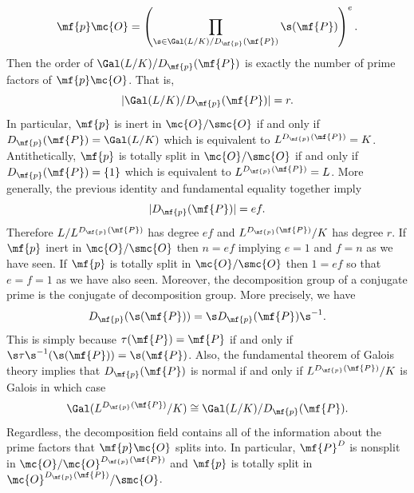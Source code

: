     \[
      \mf{p}\mc{O} = \left(\prod_{\s \in \Gal(L/K)/D_{\mf{p}}(\mf{P})}\s(\mf{P})\right)^{e}.
    \]
    Then the order of \(\Gal(L/K)/D_{\mf{p}}(\mf{P})\) is exactly the number of prime factors of \(\mf{p}\mc{O}\). That is,
    \[
      |\Gal(L/K)/D_{\mf{p}}(\mf{P})| = r.
    \]
    In particular, \(\mf{p}\) is inert in \(\mc{O}/\smc{O}\) if and only if \(D_{\mf{p}}(\mf{P}) = \Gal(L/K)\) which is equivalent to \(L^{D_{\mf{p}}(\mf{P})} = K\). Antithetically, \(\mf{p}\) is totally split in \(\mc{O}/\smc{O}\) if and only if \(D_{\mf{p}}(\mf{P}) = \{1\}\) which is equivalent to \(L^{D_{\mf{p}}(\mf{P})} = L\). More generally, the previous identity and fundamental equality together imply
    \begin{equation}\label{equ:decomposition_group_e_f_relation}
      |D_{\mf{p}}(\mf{P})| = ef.
    \end{equation}
    Therefore \(L/L^{D_{\mf{p}}(\mf{P})}\) has degree \(ef\) and \(L^{D_{\mf{p}}(\mf{P})}/K\) has degree \(r\). If \(\mf{p}\) inert in \(\mc{O}/\smc{O}\) then \(n = ef\) implying \(e = 1\) and \(f = n\) as we have seen. If \(\mf{p}\) is totally split in \(\mc{O}/\smc{O}\) then \(1 = ef\) so that \(e = f = 1\) as we have also seen. Moreover, the decomposition group of a conjugate prime is the conjugate of decomposition group. More precisely, we have
    \[
      D_{\mf{p}}(\s(\mf{P})) = \s D_{\mf{p}}(\mf{P})\s^{-1}.
    \]
    This is simply because \(\tau(\mf{P}) = \mf{P}\) if and only if \(\s\tau\s^{-1}(\s(\mf{P})) = \s(\mf{P})\). Also, the fundamental theorem of Galois theory implies that \(D_{\mf{p}}(\mf{P})\) is normal if and only if \(L^{D_{\mf{p}}(\mf{P})}/K\) is Galois in which case
    \[
      \Gal(L^{D_{\mf{p}}(\mf{P})}/K) \cong \Gal(L/K)/D_{\mf{p}}(\mf{P}).
    \]
    Regardless, the decomposition field contains all of the information about the prime factors that \(\mf{p}\mc{O}\) splits into. In particular, \(\mf{P}^{D}\) is nonsplit in \(\mc{O}/\mc{O}^{D_{\mf{p}}(\mf{P})}\) and \(\mf{p}\) is totally split in \(\mc{O}^{D_{\mf{p}}(\mf{P})}/\smc{O}\).


